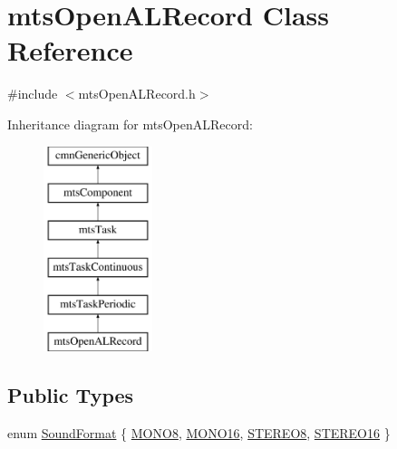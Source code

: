 \hypertarget{classmts_open_a_l_record}{}\section{mts\+Open\+A\+L\+Record Class Reference}
\label{classmts_open_a_l_record}


{\ttfamily \#include $<$mts\+Open\+A\+L\+Record.\+h$>$}

Inheritance diagram for mts\+Open\+A\+L\+Record\+:\begin{figure}[H]
\begin{center}
\leavevmode
\includegraphics[height=6.000000cm]{d6/d64/classmts_open_a_l_record}
\end{center}
\end{figure}
\subsection*{Public Types}
\begin{DoxyCompactItemize}
\item 
enum \hyperlink{classmts_open_a_l_record_a2d116a8b22a82a4255ae64c32e2c48a5}{Sound\+Format} \{ \hyperlink{classmts_open_a_l_record_a2d116a8b22a82a4255ae64c32e2c48a5a5ca88ef75354851153e15a2452873f48}{M\+O\+N\+O8}, 
\hyperlink{classmts_open_a_l_record_a2d116a8b22a82a4255ae64c32e2c48a5a01080a99fb43d5bf53f695a2844f6ca6}{M\+O\+N\+O16}, 
\hyperlink{classmts_open_a_l_record_a2d116a8b22a82a4255ae64c32e2c48a5ae7217bba22c6e7438dbf5a6351e03dfc}{S\+T\+E\+R\+E\+O8}, 
\hyperlink{classmts_open_a_l_record_a2d116a8b22a82a4255ae64c32e2c48a5a08fb0f867599715554390dcec9d8bf48}{S\+T\+E\+R\+E\+O16}
 \}
\end{DoxyCompactItemize}
